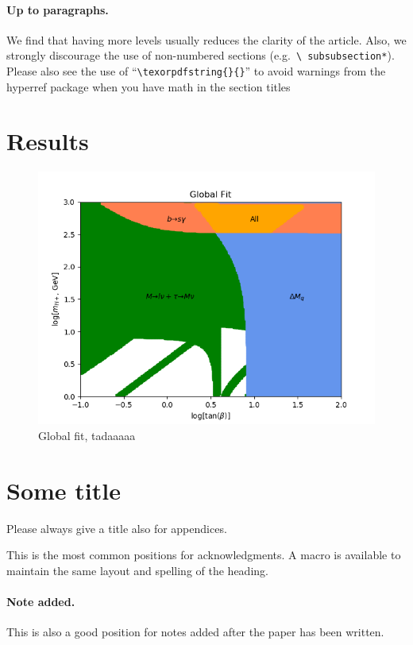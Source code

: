 \documentclass[a4paper,12pt]{article}
\begin{document}
\paragraph{Up to paragraphs.} We find that having more levels usually
reduces the clarity of the article. Also, we strongly discourage the
use of non-numbered sections (e.g.~\texttt{\textbackslash
  subsubsection*}).  Please also see the use of
``\texttt{\textbackslash texorpdfstring\{\}\{\}}'' to avoid warnings
from the hyperref package when you have math in the section titles

\section{Results}
\begin{figure}[H]
    \centering
    \includegraphics[scale=0.8]{global.png}
    \caption{\label{fig:glob} Global fit, tadaaaaa}
\end{figure}


\appendix
\section{Some title}
Please always give a title also for appendices.





\acknowledgments

This is the most common positions for acknowledgments. A macro is
available to maintain the same layout and spelling of the heading.

\paragraph{Note added.} This is also a good position for notes added
after the paper has been written.
\end{document}
